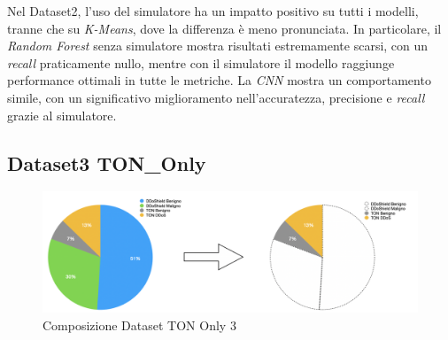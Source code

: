 \begin{table}[htbp]
\centering
\renewcommand{\arraystretch}{1.5}
\caption{Metriche di performance per Dataset2 TON\_Only}
\label{tab:performance_metrics}
\end{table}
Nel Dataset2, l'uso del simulatore ha un impatto positivo su tutti i modelli, tranne che su \textit{K-Means}, dove la differenza è meno pronunciata. In particolare, il \textit{Random Forest} senza simulatore mostra risultati estremamente scarsi, con un \textit{recall} praticamente nullo, mentre con il simulatore il modello raggiunge performance ottimali in tutte le metriche. La \textit{CNN} mostra un comportamento simile, con un significativo miglioramento nell'accuratezza, precisione e \textit{recall} grazie al simulatore.

\subsection{Dataset3 TON\_Only}

\begin{figure}[htbp]
\centering
\includegraphics[scale= 0.6]{UNINA_MSc_Thesis_Project/img/chapterRisulati/TON_Only/composizione_TON_ONLY3.png}
  \caption{Composizione Dataset TON Only 3}
\end{figure}


